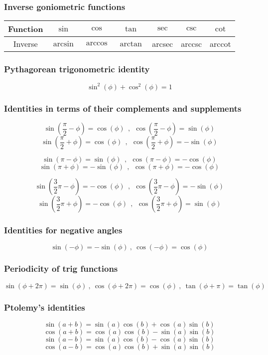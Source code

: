 \subsubsection{Inverse goniometric functions}
\begin{tabular}{  | c || c | c | c | c | c | c | }
	\hline
	Function   &  $\sin$  &  $\cos$  &  $\tan$  &  $\sec$ &  $\csc$ &  $\cot$ \\
	\hline
	Inverse   &  $\arcsin$  &  $\arccos$  &  $\arctan$  &  arcsec  &  arccsc  &  arccot \\
	\hline	
\end{tabular}


\subsubsection{Pythagorean trigonometric identity}
\[
\sin^2(\phi)+\cos^2(\phi)=1 
\]


\subsubsection{Identities in terms of their complements and supplements}
\[
\sin\left(\frac{\pi}{2}-\phi\right)=\cos(\phi) \ \ , \ \ \cos\left(\frac{\pi}{2}-\phi\right)=\sin(\phi)
\]
\[
\sin\left(\frac{\pi}{2}+\phi\right)=\cos(\phi) \ \ , \ \ \cos\left(\frac{\pi}{2}+\phi\right)=-\sin(\phi)
\]

\[
\sin(\pi-\phi)=\sin(\phi) \ \ , \ \ \cos(\pi-\phi)=-\cos(\phi)
\]
\[
\sin(\pi+\phi)=-\sin(\phi) \ \ , \ \ \cos(\pi+\phi)=-\cos(\phi)
\]

\[
\sin\left(\frac{3}{2}\pi-\phi\right)=-\cos(\phi) \ \ , \ \ \cos\left(\frac{3}{2}\pi-\phi\right)=-\sin(\phi)
\]
\[
\sin\left(\frac{3}{2}\pi+\phi\right)=-\cos(\phi) \ \ , \ \ \cos\left(\frac{3}{2}\pi+\phi\right)=\sin(\phi)
\]


\subsubsection{Identities for negative angles}
\[
\sin(-\phi) = -\sin(\phi) \ , \ \cos(-\phi) = \cos(\phi)
\]


\subsubsection{Periodicity of trig functions}
\[
\sin(\phi+2\pi)=\sin(\phi) \ , \ \cos(\phi+2\pi)=\cos(\phi) \ , \ \tan(\phi+\pi)=\tan(\phi)
\]


\subsubsection{Ptolemy's identities}
\[
\sin(a+b)=\sin(a)\cos(b)+\cos(a)\sin(b)
\]
\[
\cos(a+b)=\cos(a)\cos(b)-\sin(a)\sin(b)
\]
\[
\sin(a-b)=\sin(a)\cos(b)-\cos(a)\sin(b)
\]
\[
\cos(a-b)=\cos(a)\cos(b)+\sin(a)\sin(b)
\]

